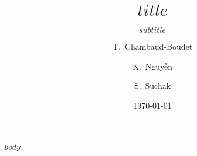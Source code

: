 \documentclass[
$if(handout)$
handout,
$endif$
]{beamer}
\date{\today}
\author{T.~Chambaud-Boudet \and K.~Nguyễn \and S.~Suchak}
\institute{\href{https://creativecommons.org/licenses/by-sa/4.0/}{Creative Commons BY-SA}}
\title{$title$}
\subtitle{$subtitle$}
\begin{document}
\maketitle

$body$
\end{document}
